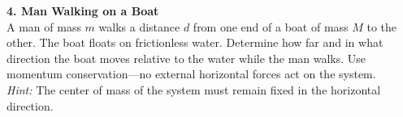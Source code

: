 {\textbf{4. Man Walking on a Boat} \\
A man of mass $m$ walks a distance $d$ from one end of a boat of mass $M$ to the other. The boat floats on frictionless water. Determine how far and in what direction the boat moves relative to the water while the man walks. Use momentum conservation—no external horizontal forces act on the system. \\
\emph{Hint:} The center of mass of the system must remain fixed in the horizontal direction.


\noindent\hrulefill

\begin{center}
\end{center}


}
